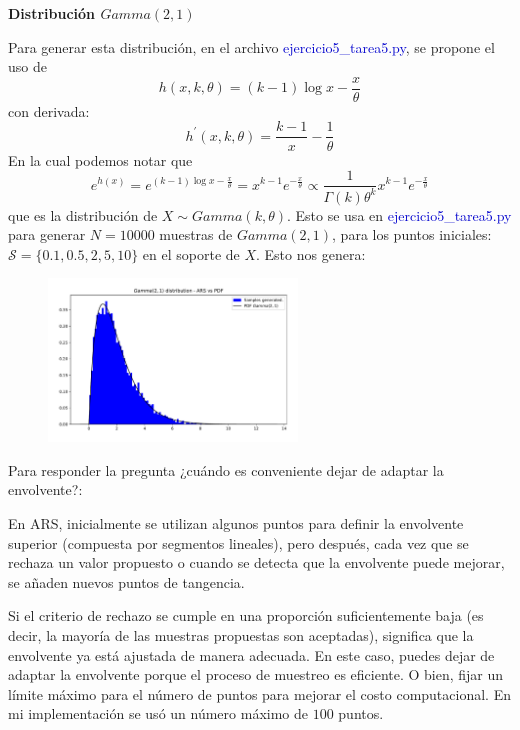 \textbf{Distribución $Gamma(2,1)$}

Para generar esta distribución, en el archivo \textcolor{mediumblue}{ejercicio5\_tarea5.py}, se propone el uso de
\begin{equation}
	h(x,k, \theta) = (k-1)\log{x} - \frac{x}{\theta}
\end{equation}
con derivada:
\begin{equation}
	h^{'}(x,k,\theta) = \frac{k-1}{x} - \frac{1}{\theta}
\end{equation}
En la cual podemos notar que
\begin{equation}
		e^{h(x)} = e^{(k-1)\log{x} - \frac{x}{\theta}} = x^{k-1} e^{-\frac{x}{\theta}} \propto \frac{1}{\Gamma(k) \theta^{k}} x^{k-1} e^{-\frac{x}{\theta}}
\end{equation}
que es la distribución de $X\sim Gamma(k,\theta)$. Esto se usa en \textcolor{mediumblue}{ejercicio5\_tarea5.py} para generar $N=10000$ muestras de $Gamma(2,1)$, para los puntos iniciales: $\mathcal{S} = \{0.1,0.5,2,5,10\}$ en el soporte de $X$. Esto nos genera:

\begin{figure}[h!]
	\centering
	\includegraphics[width=0.59\textwidth]{IMAGENES/ARS_gamma.pdf}
\end{figure}

Para responder la pregunta ¿cuándo es conveniente dejar de adaptar la envolvente?:

En ARS, inicialmente se utilizan algunos puntos para definir la envolvente superior (compuesta por segmentos lineales), pero después, cada vez que se rechaza un valor propuesto o cuando se detecta que la envolvente puede mejorar, se añaden nuevos puntos de tangencia.

Si el criterio de rechazo se cumple en una proporción suficientemente baja (es decir, la mayoría de las muestras propuestas son aceptadas), significa que la envolvente ya está ajustada de manera adecuada. En este caso, puedes dejar de adaptar la envolvente porque el proceso de muestreo es eficiente. O bien, fijar un límite máximo para el número de puntos para mejorar el costo computacional. En mi implementación se usó un número máximo de $100$ puntos.